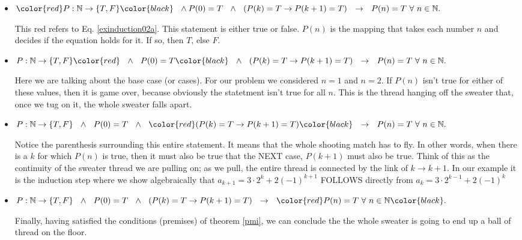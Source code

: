 \begin{itemize}

\item $\color{red}P: \mathbb{N}\to \{T, F \} \color{black} ~~\land P(0) = T ~~\land~~ (P(k) = T\to P(k+1) = T) ~~\to ~~P(n) = T ~\forall~ n\in\mathbb{N}.$    

This red refers to Eq. \ref{exinduction02a}.  This statement is either true or false.  $P(n)$ is the mapping that takes each number $n$ and decides if the equation holds for it.  If so, then $T$, else $F$.

\item $P: \mathbb{N}\to \{T, F \} \color{red}~~\land~~ P(0) = T \color{black}~~\land~~ (P(k) = T\to P(k+1) = T) ~~\to ~~P(n) = T ~\forall~ n\in\mathbb{N}.$    

Here we are talking about the base case (or cases).  For our problem we considered $n=1$ and $n=2$.  If $P(n)$ isn't true for either of these values, then it is game over, because obviously the statetment isn't true for all $n$.  This is the thread hanging off the sweater that, once we tug on it, the whole sweater falls apart.


\item $P: \mathbb{N}\to \{T, F \} ~~\land~~ P(0) = T ~~\land~~ \color{red}(P(k) = T\to P(k+1) = T) \color{black}~~\to ~~P(n) = T ~\forall~ n\in\mathbb{N}.$    

Notice the parenthesis surrounding this entire statement.  It means that the whole shooting match has to fly.  In other words, when there is a $k$ for which $P(n)$ is true, then it must also be true that the NEXT case, $P(k+1)$ must also be true.  Think of this as the continuity of the sweater thread we are pulling on; as we pull, the entire thread is connected by the link of $k\to k+1$.  In our example it is the induction step where we show algebraically that $a_{k+1} = 3\cdot 2^{k}+2(-1)^{k+1} $ FOLLOWS directly from $a_{k} = 3\cdot 2^{k-1}+2(-1)^{k}$ 


\item $P: \mathbb{N}\to \{T, F \} ~~\land~~ P(0) = T ~~\land~~(P(k) = T\to P(k+1) = T) ~~\to ~~ \color{red}P(n) = T ~\forall~ n\in\mathbb{N} \color{black}.$    

Finally, having satisfied the conditions (premises) of theorem \ref{pmi}, we can conclude the the whole sweater is going to end up a ball of thread on the floor.
\end{itemize}

